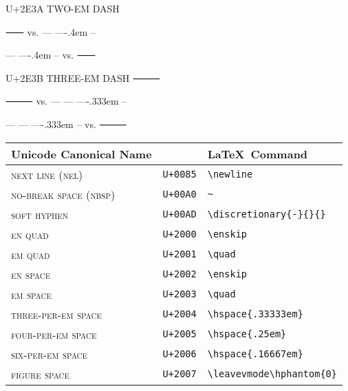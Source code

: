 \documentclass{scrartcl}
\begin{document}
\def\checkno	{\!\!\llap{\textcolor{red}{~\textbf{\ding{55}}}}}
\def\checkyes	{\!\!\llap{\textcolor{green}{~\textbf{\ding{51}}}}}


U+2E3A	TWO-EM DASH

⸺ vs. —\kern -1pt —\kern -.4em –

—\kern -1pt —\kern -.4em – vs. ⸺

U+2E3B		THREE-EM DASH				⸻

⸻		vs.		—\kern -1pt —\kern -1pt —\kern -.333em –

—\kern -1pt —\kern -1pt —\kern -.333em – vs. ⸻


\begin{table}
\begin{tabular}{lll}
\textbf{\Large Unicode Canonical Name}						&&	\textbf{\Large \LaTeX ~Command} \\\midrule
\checkyes\quad\textsc{next line (nel)}					&	\texttt{U+0085}	&	\small\verb+\newline+\\
\checkyes\quad\textsc{no-break space (nbsp)}			&	\texttt{U+00A0}	&	\small\verb+~+\\
\checkyes\quad\textsc{soft hyphen}						&	\texttt{U+00AD}	&	\small\verb+\discretionary{-}{}{}+\\
\checkyes\quad\textsc{en quad}							&	\texttt{U+2000}	&	\small\verb+\enskip+\\
\checkyes\quad\textsc{em quad}							&	\texttt{U+2001}	&	\small\verb+\quad+\\
\checkyes\quad\textsc{en space}						&	\texttt{U+2002}	&	\small\verb+\enskip+\\
\checkyes\quad\textsc{em space}						&	\texttt{U+2003}	&	\small\verb+\quad+\\
\checkyes\quad\textsc{three-per-em space}				&	\texttt{U+2004}	&	\small\verb+\hspace{.33333em}+\\
\checkyes\quad\textsc{four-per-em space}				&	\texttt{U+2005}	&	\small\verb+\hspace{.25em}+\\
\checkyes\quad\textsc{six-per-em space}				&	\texttt{U+2006}	&	\small\verb+\hspace{.16667em}+\\
\checkyes\quad\textsc{figure space} 					&	\texttt{U+2007}	&	\small\verb+\leavevmode\hphantom{0}+ \\

\end{tabular}
\end{table}
\end{document}
